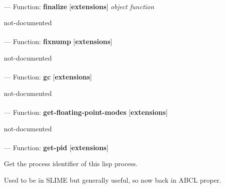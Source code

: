 \paragraph{}
\label{EXTENSIONS:FINALIZE}
--- Function: \textbf{finalize} [\textbf{extensions}] \textit{object function}

\begin{adjustwidth}{5em}{5em}
not-documented
\end{adjustwidth}

\paragraph{}
\label{EXTENSIONS:FIXNUMP}
--- Function: \textbf{fixnump} [\textbf{extensions}] \textit{}

\begin{adjustwidth}{5em}{5em}
not-documented
\end{adjustwidth}

\paragraph{}
\label{EXTENSIONS:GC}
--- Function: \textbf{gc} [\textbf{extensions}] \textit{}

\begin{adjustwidth}{5em}{5em}
not-documented
\end{adjustwidth}

\paragraph{}
\label{EXTENSIONS:GET-FLOATING-POINT-MODES}
--- Function: \textbf{get-floating-point-modes} [\textbf{extensions}] \textit{}

\begin{adjustwidth}{5em}{5em}
not-documented
\end{adjustwidth}

\paragraph{}
\label{EXTENSIONS:GET-PID}
--- Function: \textbf{get-pid} [\textbf{extensions}] \textit{}

\begin{adjustwidth}{5em}{5em}
Get the process identifier of this lisp process. 

Used to be in SLIME but generally useful, so now back in ABCL proper.
\end{adjustwidth}

